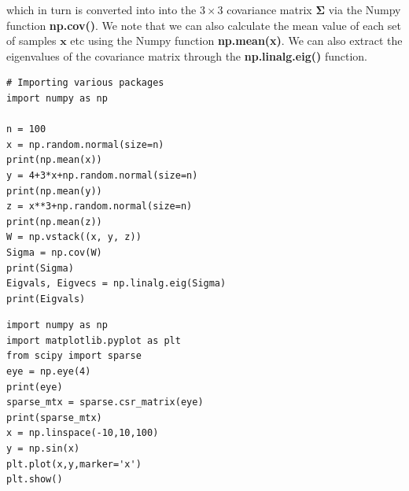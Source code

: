\documentclass{beamer}
\begin{document}
\begin{frame}
which in turn is converted into into the $3\times 3$ covariance matrix
$\bm{\Sigma}$ via the Numpy function \textbf{np.cov()}. We note that we can also calculate
the mean value of each set of samples $\bm{x}$ etc using the Numpy
function \textbf{np.mean(x)}. We can also extract the eigenvalues of the
covariance matrix through the \textbf{np.linalg.eig()} function.

















\begin{verbatim}
# Importing various packages
import numpy as np

n = 100
x = np.random.normal(size=n)
print(np.mean(x))
y = 4+3*x+np.random.normal(size=n)
print(np.mean(y))
z = x**3+np.random.normal(size=n)
print(np.mean(z))
W = np.vstack((x, y, z))
Sigma = np.cov(W)
print(Sigma)
Eigvals, Eigvecs = np.linalg.eig(Sigma)
print(Eigvals)

\end{verbatim}














\begin{verbatim}
import numpy as np
import matplotlib.pyplot as plt
from scipy import sparse
eye = np.eye(4)
print(eye)
sparse_mtx = sparse.csr_matrix(eye)
print(sparse_mtx)
x = np.linspace(-10,10,100)
y = np.sin(x)
plt.plot(x,y,marker='x')
plt.show()

\end{verbatim}
\end{frame}
\end{document}
